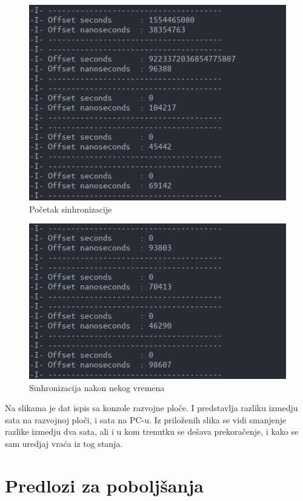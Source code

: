 \documentclass[a4paper,12pt, master]{etf}
\begin{document}
    \begin{figure}[htb]
			\centering
			\includegraphics[scale=1.5]{../pic/ptp_time_1.png}
            \caption{Po\v{c}etak sinhronizacije}
			\label{fig:ptp_time_1}
	\end{figure}

    \begin{figure}[htb]
			\centering
			\includegraphics[scale=1.5]{../pic/ptp_time_2.png}
            \caption{Sinhronizacija nakon nekog vremena}
			\label{fig:ptp_time_2}
	\end{figure}

	Na slikama je dat ispis sa konzole razvojne plo\v{c}e. I predstavlja
	razliku izmedju sata na razvojnoj plo\v{c}i, i sata na PC-u. Iz
	prilo\v{z}enih slika se vidi smanjenje razlike izmedju dva sata, ali i u
	kom trenutku se de\v{s}ava prekora\v{c}enje, i kako se sam uredjaj
	vra\'{c}a iz tog stanja.

	\section{Predlozi za pobolj\v{s}anja}
\end{document}
